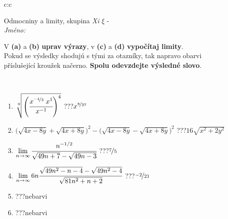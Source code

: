 \documentclass[10pt]{report}
\begin{document}
\newpage
\thispagestyle{empty}
\begin{tabular}{c:c}
\begin{minipage}[c][104.5mm][t]{0.5\linewidth}
\begin{center}
\vspace{7mm}
{\huge Odmocniny a limity, skupina \textit{Xi $\xi$} -}\\[5mm]
\textit{Jméno:}\phantom{xxxxxxxxxxxxxxxxxxxxxxxxxxxxxxxxxxxxxxxxxxxxxxxxxxxxxxxxxxxxxxxxx}\\[5mm]
\begin{minipage}{0.95\linewidth}
\begin{center}
V \textbf{(a)} a \textbf{(b)} \textbf{uprav výrazy}, v \textbf{(c)} a \textbf{(d)} \textbf{vypočítaj limity}.\\Pokud se výsledky shodujú s tými za otazníky, tak napravo obarvi\\příslušející kroužek načerno. \textbf{Spolu odevzdejte výsledné slovo}.
\end{center}
\end{minipage}
\\[1mm]
\begin{minipage}{0.79\linewidth}
\begin{center}
\begin{varwidth}{\linewidth}
\begin{enumerate}
\small
\item $\sqrt[9]{\left(\cfrac{x^{\nicefrac{-4}{3}}\;x^{1}}{x^{-1}}\right)^{4}}$\quad \dotfill\; ???\;\dotfill \quad $x^{\nicefrac{8}{27}}$
\item {\footnotesize{\scriptsize$\big(\sqrt{4x-8y}+\sqrt{4x+8y}\big)^2-\big(\sqrt{4x-8y}-\sqrt{4x+8y}\big)^2$}\quad \dotfill\; ???\;\dotfill \quad $16\sqrt{x^2+2y^2}$}
\item $\lim\limits_{n\to\infty}\cfrac{n^{-1/2}}{\sqrt{49n+7}-\sqrt{49n-3}}$\quad \dotfill\; ???\;\dotfill \quad $\nicefrac{7}{5}$
\item $\lim\limits_{n\to\infty}6n\cfrac{\sqrt{49n^2-n-4}-\sqrt{49n^2-4}}{\sqrt{81n^2+n+2}}$\quad \dotfill\; ???\;\dotfill \quad $\nicefrac{-2}{21}$
\item \quad \dotfill\; ???\;\dotfill \quad nebarvi
\item \quad \dotfill\; ???\;\dotfill \quad nebarvi
\end{enumerate}
\end{varwidth}
\end{center}
\end{minipage}
\begin{minipage}{0.20\linewidth}

\end{minipage}
\end{center}
\end{minipage}
\end{tabular}
\end{document}
